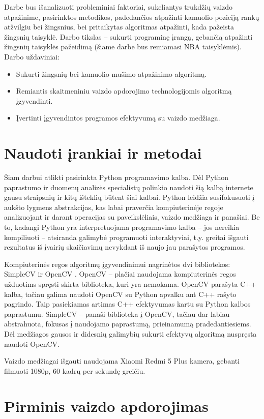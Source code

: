 \documentclass{VUMIFPSkursinis}
\begin{document}
Darbe bus išanalizuoti probleminiai faktoriai, sukeliantys trukdžių vaizdo atpažinime, pasirinktos metodikos, padedančios atpažinti kamuolio poziciją rankų atžvilgiu bei žingsnius, bei pritaikytas algoritmas atpažinti, kada pažeista žingsnių taisyklė. Darbo tikslas – sukurti programinę įrangą, gebančią atpažinti žingsnių taisyklės pažeidimą (šiame darbe bus remiamasi NBA taisyklėmis). Darbo uždaviniai:
\begin{itemize}
 \item Sukurti žingsnių bei kamuolio mušimo atpažinimo algoritmą.
 \item Remiantis skaitmeniniu vaizdo apdorojimo technologijomis algoritmą įgyvendinti.
 \item Įvertinti įgyvendintos programos efektyvumą su vaizdo medžiaga.
\end{itemize}

\section{Naudoti įrankiai ir metodai}
Šiam darbui atlikti pasirinkta Python programavimo kalba. Dėl Python paprastumo ir duomenų analizės specialistų polinkio naudoti šią kalbą internete gausu straipsnių ir kitų išteklių būtent šiai kalbai. Python leidžia susifokusuoti į aukšto lygmens abstrakcijas, kas labai praverčia kompiuterinėje regoje analizuojant ir darant operacijas su paveikslėliais, vaizdo medžiaga ir panašiai. Be to, kadangi Python yra interpretuojama programavimo kalba – jos nereikia kompiliuoti – atsiranda galimybė programuoti interaktyviai, t.y. greitai išgauti rezultatus iš įvairių skaičiavimų nevykdant iš naujo jau parašytos programos. 

Kompiuterinės regos algoritmų įgyvendinimui nagrinėtos dvi bibliotekos: SimpleCV \cite{SimpleCV} ir OpenCV \cite{OpenCV}. OpenCV – plačiai naudojama kompiuterinės regos užduotims spręsti skirta biblioteka, kuri yra nemokama. OpenCV parašyta C++ kalba, tačiau galima naudoti OpenCV su  Python apvalku ant C++ rašyto pagrindo. Taip pasiekiamas artimas C++ efektyvumas kartu su Python kalbos paprastumu.
SimpleCV – panaši biblioteka į OpenCV, tačiau dar labiau abstrahuota, fokusas į naudojamo paprastumą, prieinamumą pradedantiesiems. Dėl medžiagos gausos ir didesnių galimybių sukurti efektyvų algoritmą nuspręsta naudoti OpenCV.

Vaizdo medžiagai išgauti naudojama Xiaomi Redmi 5 Plus kamera, gebanti filmuoti 1080p, 60 kadrų per sekundę greičiu. 
\section{Pirminis vaizdo apdorojimas}
\end{document}
